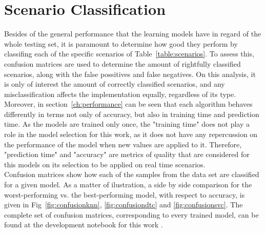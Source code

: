 \section{Scenario Classification}
Besides of the general performance that the learning models have in regard of the whole testing set, it is paramount to determine how good they perform by classifing each of the specific scenarios of Table~\ref{table:scenarios}. To assess this, confusion matrices are used to determine the amount of rightfully classified scenarios, along with the false possitives and false negatives. On this analysis, it is only of interest the amount of correctly classified scenarios, and any misclassification affects the implementation equally, regardless of its type. Moreover, in section~\ref{ch:performance} can be seen that each algorithm behaves differently in terms not only of accuracy, but also in training time and prediction time. As the models are trained only once, the "training time" does not play a role in the model selection for this work, as it does not have any repercussion on the performance of the model when new values are applied to it. Therefore, "prediction time" and "accuracy" are metrics of quality that are considered for this models on its selection to be applied on real time scenarios.\\

Confusion matrices show how each of the samples from the data set are classified for a given model. As a matter of ilustration, a side by side comparison for the worst-performing vs. the best-performing model, with respect to accuracy, is given in Fig~\ref{fig:confusionknn}, \ref{fig:confusiondtc} and \ref{fig:confusionsvc}. The complete set of confusion matrices, corresponding to every trained model, can be found at the development notebook for this work \cite{repo:cognitive_radio_ml}.


